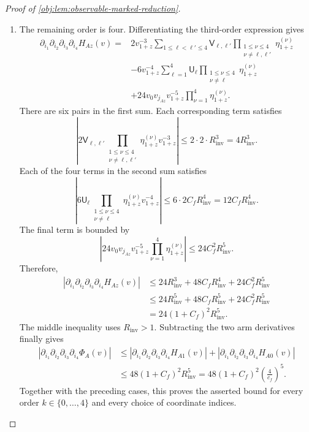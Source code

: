 \documentclass[11pt]{article}
\begin{document}
\begin{proof}[Proof of \cref{obj:lem:observable-marked-reduction}]
\begin{enumerate}
\item The remaining order is four. Differentiating the third-order expression gives
\[
\begin{aligned}
\partial_{i_1}\partial_{i_2}\partial_{i_3}\partial_{i_4}H_{Az}(v)
={}&
2v_{1+z}^{-3}
\sum_{1\le\ell<\ell'\le4}
\mathsf V_{\ell,\ell'}
\prod_{\substack{1\le\nu\le4\\\nu\ne\ell,\ell'}}
\eta^{(\nu)}_{1+z}\\
&-6v_{1+z}^{-4}
\sum_{\ell=1}^4
\mathsf U_\ell
\prod_{\substack{1\le\nu\le4\\\nu\ne\ell}}
\eta^{(\nu)}_{1+z}\\
&+24v_0v_{j_{Az}}v_{1+z}^{-5}
\prod_{\nu=1}^4\eta^{(\nu)}_{1+z}.
\end{aligned}
\]
There are six pairs in the first sum. Each corresponding term satisfies
\[
\left|
2\mathsf V_{\ell,\ell'}
\prod_{\substack{1\le\nu\le4\\\nu\ne\ell,\ell'}}
\eta^{(\nu)}_{1+z}v_{1+z}^{-3}
\right|
\le2\cdot2\cdot R_{\mathrm{inv}}^3
=4R_{\mathrm{inv}}^3.
\]
Each of the four terms in the second sum satisfies
\[
\left|
6\mathsf U_\ell
\prod_{\substack{1\le\nu\le4\\\nu\ne\ell}}
\eta^{(\nu)}_{1+z}v_{1+z}^{-4}
\right|
\le6\cdot2C_fR_{\mathrm{inv}}^4
=12C_fR_{\mathrm{inv}}^4.
\]
The final term is bounded by
\[
\left|
24v_0v_{j_{Az}}v_{1+z}^{-5}
\prod_{\nu=1}^4\eta^{(\nu)}_{1+z}
\right|
\le24C_f^2R_{\mathrm{inv}}^5.
\]
Therefore,
\[
\begin{aligned}
|\partial_{i_1}\partial_{i_2}\partial_{i_3}\partial_{i_4}H_{Az}(v)|
&\le24R_{\mathrm{inv}}^3
    +48C_fR_{\mathrm{inv}}^4
    +24C_f^2R_{\mathrm{inv}}^5\\
&\le24R_{\mathrm{inv}}^5
    +48C_fR_{\mathrm{inv}}^5
    +24C_f^2R_{\mathrm{inv}}^5\\
&=24(1+C_f)^2R_{\mathrm{inv}}^5.
\end{aligned}
\]
The middle inequality uses \(R_{\mathrm{inv}}>1\). Subtracting the two arm derivatives finally gives
\[
\begin{aligned}
|\partial_{i_1}\partial_{i_2}\partial_{i_3}\partial_{i_4}\Phi_A(v)|
&\le
|\partial_{i_1}\partial_{i_2}\partial_{i_3}\partial_{i_4}H_{A1}(v)|
+
|\partial_{i_1}\partial_{i_2}\partial_{i_3}\partial_{i_4}H_{A0}(v)|\\
&\le48(1+C_f)^2R_{\mathrm{inv}}^5
=48(1+C_f)^2\left(\frac4{c_f}\right)^5.
\end{aligned}
\]
Together with the preceding cases, this proves the asserted bound for every order \(k\in\{0,\ldots,4\}\) and every choice of coordinate indices.
\end{enumerate}
\end{proof}
\end{document}
